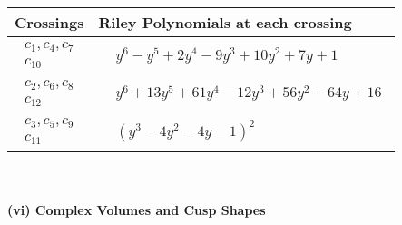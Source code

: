 \documentclass[1p]{elsarticle_modified}
\theoremstyle{definition}
\begin{document}
\begin{tabular}{m{50pt}|m{274pt}}
Crossings & \hspace{64pt}Riley Polynomials at each crossing \\
\hline $$\begin{aligned}c_{1},c_{4},c_{7}\\c_{10}\end{aligned}$$&$\begin{aligned}
&y^6- y^5+2 y^4-9 y^3+10 y^2+7 y+1
\end{aligned}$\\
\hline $$\begin{aligned}c_{2},c_{6},c_{8}\\c_{12}\end{aligned}$$&$\begin{aligned}
&y^6+13 y^5+61 y^4-12 y^3+56 y^2-64 y+16
\end{aligned}$\\
\hline $$\begin{aligned}c_{3},c_{5},c_{9}\\c_{11}\end{aligned}$$&$\begin{aligned}
&(y^3-4 y^2-4 y-1)^2
\end{aligned}$\\
\hline
\end{tabular}\\~\\
\newpage\flushleft \textbf{(vi) Complex Volumes and Cusp Shapes}
\end{document}
